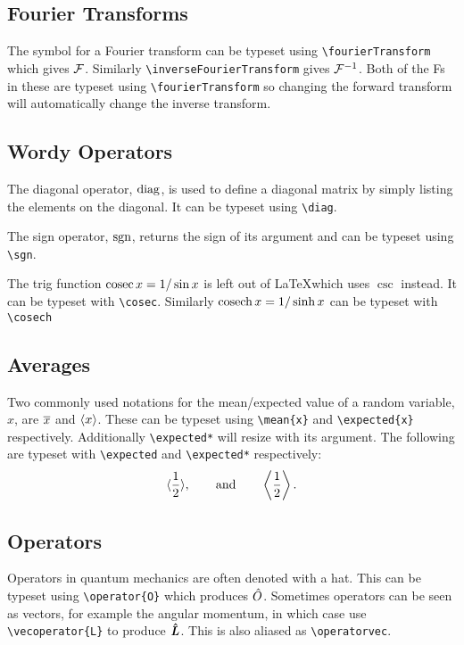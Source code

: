 \documentclass[fleqn, a4paper, openany]{memoir}
\begin{document}
    \subsection{Fourier Transforms}
    The symbol for a Fourier transform can be typeset using \verb*|\fourierTransform| which gives \(\mathcal{F}\).
    Similarly \verb*|\inverseFourierTransform| gives \(\mathcal{F}^{-1}\).
    Both of the Fs in these are typeset using \verb*|\fourierTransform| so changing the forward transform will automatically change the inverse transform.
    
    \subsection{Wordy Operators}
    The diagonal operator, \(\operatorname{diag}\), is used to define a diagonal matrix by simply listing the elements on the diagonal.
    It can be typeset using \verb*|\diag|.
    
    The sign operator, \(\operatorname{sgn}\), returns the sign of its argument and can be typeset using \verb*|\sgn|.
    
    The trig function \(\operatorname{cosec} x = 1/\sin x\) is left out of \LaTeX which uses \(\csc\) instead.
    It can be typeset with \verb*|\cosec|.
    Similarly \(\operatorname{cosech} x = 1/\sinh x\) can be typeset with \verb*|\cosech|
    
    \subsection{Averages}
    Two commonly used notations for the mean/expected value of a random variable, \(x\), are \(\overline{x}\) and \(\expected{x}\).
    These can be typeset using \verb*|\mean{x}| and \verb*|\expected{x}| respectively.
    Additionally \verb*|\expected*| will resize with its argument.
    The following are typeset with \verb*|\expected| and \verb*|\expected*| respectively:
    \begin{equation}
        \expected{\frac{1}{2}}, \qquad\text{and}\qquad \expected*{\frac{1}{2}}.
    \end{equation}

    \subsection{Operators}
    Operators in quantum mechanics are often denoted with a hat.
    This can be typeset using \verb*|\operator{O}| which produces \(\hat{O}\).
    Sometimes operators can be seen as vectors, for example the angular momentum, in which case use \verb*|\vecoperator{L}| to produce \(\bm{\hat{L}}\).
    This is also aliased as \verb*|\operatorvec|.
    
\end{document}
